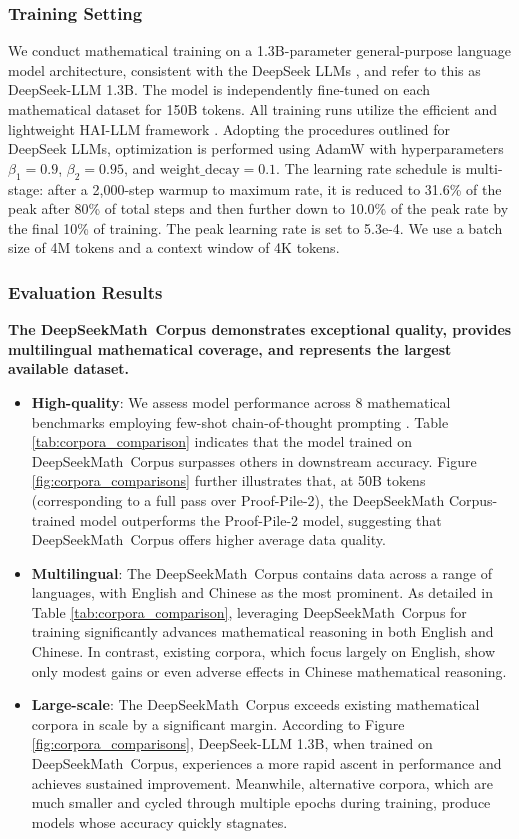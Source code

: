\subsubsection{Training Setting}
\label{sec:quality-policy}
We conduct mathematical training on a 1.3B-parameter general-purpose language model architecture, consistent with the DeepSeek LLMs \citep{deepseek-llm}, and refer to this as DeepSeek-LLM 1.3B. The model is independently fine-tuned on each mathematical dataset for 150B tokens. All training runs utilize the efficient and lightweight HAI-LLM framework \citep{haillm}. Adopting the procedures outlined for DeepSeek LLMs, optimization is performed using AdamW \citep{adamW} with hyperparameters $\beta_1=0.9$, $\beta_2=0.95$, and $\mathrm{weight\_decay}=0.1$. The learning rate schedule is multi-stage: after a 2,000-step warmup to maximum rate, it is reduced to 31.6\% of the peak after 80\% of total steps and then further down to 10.0\% of the peak rate by the final 10\% of training. The peak learning rate is set to 5.3e-4. We use a batch size of 4M tokens and a context window of 4K tokens.

\subsubsection{Evaluation Results}

\textbf{The DeepSeekMath~Corpus demonstrates exceptional quality, provides multilingual mathematical coverage, and represents the largest available dataset.}

\begin{itemize}[topsep=0pt]
    \item \textbf{High-quality}:
    We assess model performance across 8 mathematical benchmarks employing few-shot chain-of-thought prompting \cite{cot}. Table \ref{tab:corpora_comparison} indicates that the model trained on DeepSeekMath~Corpus surpasses others in downstream accuracy. Figure \ref{fig:corpora_comparisons} further illustrates that, at 50B tokens (corresponding to a full pass over Proof-Pile-2), the DeepSeekMath Corpus-trained model outperforms the Proof-Pile-2 model, suggesting that DeepSeekMath~Corpus offers higher average data quality.
    \item \textbf{Multilingual}:
    The DeepSeekMath~Corpus contains data across a range of languages, with English and Chinese as the most prominent. As detailed in Table \ref{tab:corpora_comparison}, leveraging DeepSeekMath~Corpus for training significantly advances mathematical reasoning in both English and Chinese. In contrast, existing corpora, which focus largely on English, show only modest gains or even adverse effects in Chinese mathematical reasoning.
    \item \textbf{Large-scale}:
    The DeepSeekMath~Corpus exceeds existing mathematical corpora in scale by a significant margin. According to Figure \ref{fig:corpora_comparisons}, DeepSeek-LLM 1.3B, when trained on DeepSeekMath~Corpus, experiences a more rapid ascent in performance and achieves sustained improvement. Meanwhile, alternative corpora, which are much smaller and cycled through multiple epochs during training, produce models whose accuracy quickly stagnates.
\end{itemize}

